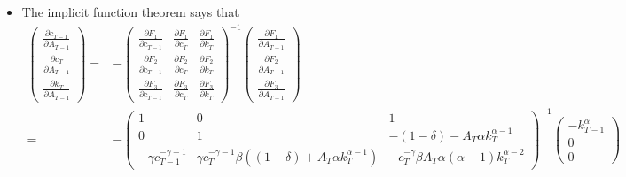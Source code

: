 \documentclass[compress]{beamer}
\begin{document}
\begin{frame}
  \begin{itemize}
  \item The implicit function theorem says that
    \begin{align*}
      \begin{pmatrix} \frac{\partial c_{T-1}}{\partial A_{T-1}} \\ 
        \frac{\partial c_{T}} {\partial A_{T-1}} \\ 
    \frac{\partial
      k_{T}} {\partial A_{T-1}} \end{pmatrix} = & 
  -\begin{pmatrix} 
    \frac{\partial F_1}{\partial c_{T-1}} & 
    \frac{\partial F_1}{\partial c_{T}} & 
    \frac{\partial F_1}{\partial k_{T}} \\
    \frac{\partial F_2}{\partial c_{T-1}} & 
    \frac{\partial F_2}{\partial c_{T}} & 
    \frac{\partial F_2}{\partial k_{T}} \\
    \frac{\partial F_3}{\partial c_{T-1}} & 
    \frac{\partial F_3}{\partial c_{T}} & 
    \frac{\partial F_3}{\partial k_{T}} 
  \end{pmatrix}^{-1} \begin{pmatrix} 
    \frac{\partial F_1}{\partial A_{T-1}} \\     
    \frac{\partial F_2}{\partial A_{T-1}} \\
    \frac{\partial F_3}{\partial A_{T-1}} 
  \end{pmatrix} \\
  = & 
  -\begin{pmatrix} 
    1 & 0 & 1 \\
    0 & 1 & -(1-\delta) - A_T\alpha k_T^{\alpha-1} \\
    -\gamma c_{T-1}^{-\gamma-1} & \gamma c_{T}^{-\gamma-1}
    \beta\left((1-\delta) + A_T \alpha k_T^{\alpha-1}\right) &
    -c_T^{-\gamma} \beta A_T \alpha (\alpha-1) k_T^{\alpha-2} 
  \end{pmatrix}^{-1} 
  \begin{pmatrix}
    -k_{T-1}^\alpha \\
    0 \\
    0
  \end{pmatrix} \\
\end{align*}
\end{itemize}
\end{frame}
\end{document}
